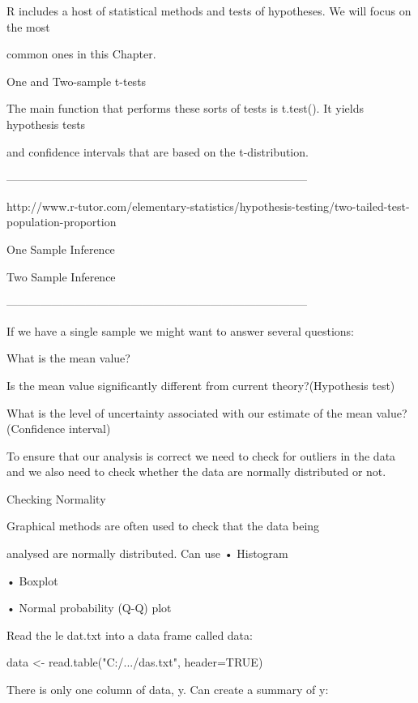 \begin{frame}
R includes a host of statistical methods and tests of hypotheses. We will focus on the most

common ones in this Chapter.

One and Two-sample t-tests

The main function that performs these sorts of tests is t.test(). It yields hypothesis tests

and confidence intervals that are based on the t-distribution. 


 



--------------------------------------------------------------------------------
 

http://www.r-tutor.com/elementary-statistics/hypothesis-testing/two-tailed-test-population-proportion

 

One Sample Inference

Two Sample Inference



--------------------------------------------------------------------------------
 

If we have a single sample we might want to answer several questions:

 

What is the mean value?

Is the mean value significantly different from current theory?(Hypothesis test)

What is the level of uncertainty associated with our estimate of the mean value? (Confidence interval)

 

To ensure that our analysis is correct we need to check for outliers in the data and we also need to check whether the data are normally distributed or not.

  

 

Checking Normality

Graphical methods are often used to check that the data being

analysed are normally distributed. Can use
•
Histogram

•
Boxplot

•
Normal probability (Q-Q) plot


Read the le dat.txt into a data frame called data:

data <- read.table("C:/.../das.txt", header=TRUE)

There is only one column of data, y. Can create a summary of y:


\end{frame}
